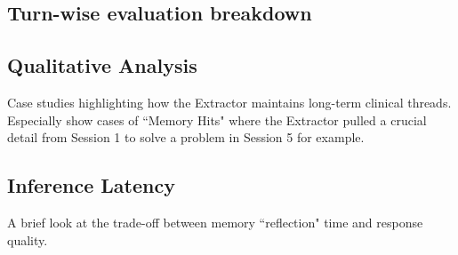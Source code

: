 \documentclass{article} %
\begin{document}
\begin{table}[h]
\centering
\caption{Per-patient breakdown of CBT Adherence and Persona Consistency scores (mean $\pm$ std).}
\end{table}
\subsection{Turn-wise evaluation breakdown}


\subsection{Qualitative Analysis}
Case studies highlighting how the Extractor maintains long-term clinical threads. Especially show cases of ``Memory Hits" where the Extractor pulled a crucial detail from Session 1 to solve a problem in Session 5 for example.

\subsection{Inference Latency}
A brief look at the trade-off between memory ``reflection" time and response quality.
\end{document}
